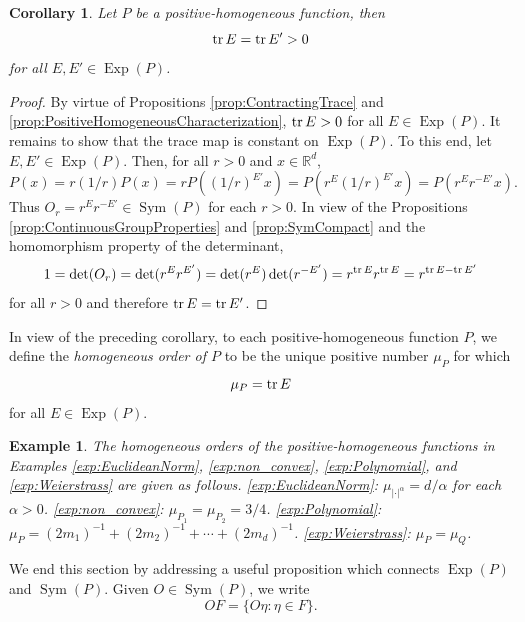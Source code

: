 \documentclass[11pt]{article}
\newtheorem{corollary}[theorem]{Corollary}
\newtheorem{example}{Example}
\theoremstyle{remark}
\newcommand\Sym{\operatorname{Sym}}
\newcommand\Exp{\operatorname{Exp}}
\renewcommand\det{\operatorname{det}}
\begin{document}
\begin{corollary}\label{cor:TraceisInvariant}
Let $P$ be a positive-homogeneous function, then
\begin{equation*}
\tr E=\tr E'>0
\end{equation*}
for all $E,E'\in\Exp(P)$.
\end{corollary}
\begin{proof}
By virtue of Propositions \ref{prop:ContractingTrace} and \ref{prop:PositiveHomogeneousCharacterization}, $\tr E>0$ for all $E\in\Exp(P)$. It remains to show that the trace map is constant on $\Exp(P)$. To this end, let $E,E'\in\Exp(P)$. Then, for all $r>0$ and $x\in\mathbb{R}^d$,
\begin{equation*}
P(x)=r(1/r)P(x)=rP((1/r)^{E'}x)=P(r^E(1/r)^{E'}x)=P(r^{E}r^{-E'}x).
\end{equation*}
Thus $O_r=r^{E}r^{-E'}\in\Sym(P)$ for each $r>0$. In view of the Propositions \ref{prop:ContinuousGroupProperties} and \ref{prop:SymCompact} and the homomorphism property of the determinant,
\begin{equation*}
1=\det(O_r)=\det(r^{E}r^{E'})=\det(r^{E})\det(r^{-E'})=r^{\tr E}r^{\tr E}=r^{\tr E-\tr E'}
\end{equation*}
for all $r>0$ and therefore $\tr E=\tr E'$.
\end{proof}

\noindent In view of the preceding corollary, to each positive-homogeneous function $P$, we define the \textit{homogeneous order of $P$} to be the unique positive number $\mu_P$ for which
\begin{equation*}
\mu_P=\tr E
\end{equation*}
for all $E\in\Exp(P)$. 

\begin{example}\normalfont The homogeneous orders of the positive-homogeneous functions in Examples \ref{exp:EuclideanNorm}, \ref{exp:non_convex}, \ref{exp:Polynomial}, and \ref{exp:Weierstrass} are given as follows. \ref{exp:EuclideanNorm}: $\mu_{|\cdot|^{\alpha}}=d/\alpha$ for each $\alpha>0$. \ref{exp:non_convex}: $\mu_{P_1}=\mu_{P_2}=3/4$. \ref{exp:Polynomial}: $\mu_P=(2m_1)^{-1}+(2m_2)^{-1}+\cdots+(2m_d)^{-1}$. \ref{exp:Weierstrass}: $\mu_P=\mu_Q$.
\end{example}


\noindent We end this section by addressing a useful proposition which connects $\Exp(P)$ and $\Sym(P)$. Given $O\in\Sym(P)$, we write
\begin{equation*}
    OF=\{O\eta:\eta\in F\}.
\end{equation*}
\end{document}
